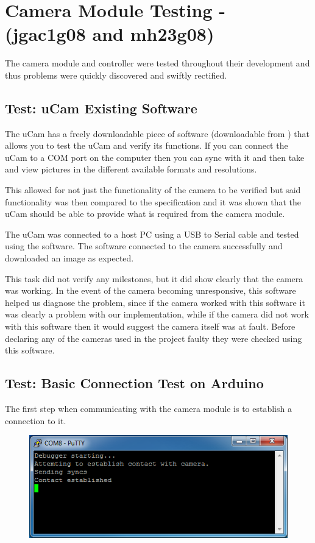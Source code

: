 \section{Camera Module Testing - (jgac1g08 and mh23g08)}

The camera module and controller were tested throughout their development and thus problems were quickly discovered and swiftly rectified.

\subsection{Test: uCam Existing Software}

The uCam has a freely downloadable piece of software (downloadable from \cite{ucam_test_software}) that allows you to test the uCam and verify its functions. If you can connect the uCam to a COM port on the computer then you can sync with it and then take and view pictures in the different available formats and resolutions.

This allowed for not just the functionality of the camera to be verified but said functionality was then compared to the specification and it was shown that the uCam should be able to provide what is required from the camera module.

The uCam was connected to a host PC using a USB to Serial cable and tested using the software. The software connected to the camera successfully and downloaded an image as expected.

This task did not verify any milestones, but it did show clearly that the camera was working. In the event of the camera becoming unresponsive, this software helped us diagnose the problem, since if the camera worked with this software it was clearly a problem with our implementation, while if the camera did not work with this software then it would suggest the camera itself was at fault. Before declaring any of the cameras used in the project faulty they were checked using this software.

\subsection{Test: Basic Connection Test on Arduino}
The first step when communicating with the camera module is to establish a connection to it.

\begin{figure}[H]
        \centering
        \includegraphics[width=1.0\textwidth]{testing_screenshots/camera_basic_connection_test.png}
        \label{fig:test_basic_connection}
\end{figure}

